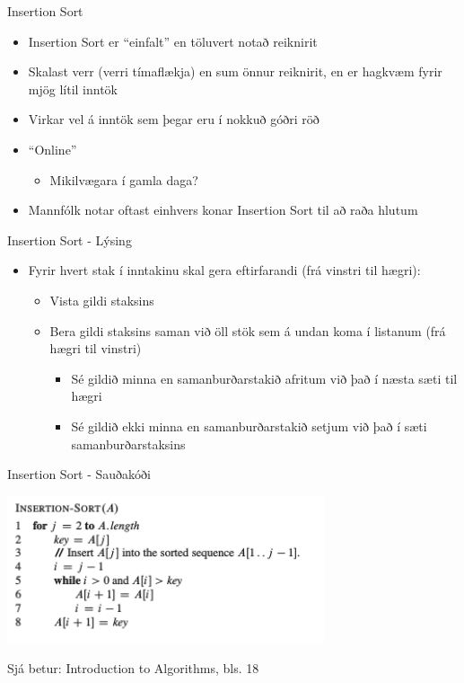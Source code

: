 \documentclass[handout]{beamer}
\begin{document}
\begin{frame}{Insertion Sort}
\begin{itemize}
 \item Insertion Sort er ``einfalt'' en töluvert notað reiknirit
 \item Skalast verr (verri tímaflækja) en sum önnur reiknirit, en er hagkvæm fyrir mjög lítil inntök
 \item Virkar vel á inntök sem þegar eru í nokkuð góðri röð
 \item ``Online''
 \begin{itemize}
  \item Mikilvægara í gamla daga?
 \end{itemize}
 \item Mannfólk notar oftast einhvers konar Insertion Sort til að raða hlutum
\end{itemize}
\end{frame}

\begin{frame}{Insertion Sort - Lýsing}
\begin{itemize}
 \item Fyrir hvert stak í inntakinu skal gera eftirfarandi (frá vinstri til hægri):
 \begin{itemize}
  \item Vista gildi staksins
  \item Bera gildi staksins saman við öll stök sem á undan koma í listanum (frá hægri til vinstri)
  \begin{itemize}
   \item Sé gildið minna en samanburðarstakið afritum við það í næsta sæti til hægri
   \item Sé gildið ekki minna en samanburðarstakið setjum við það í sæti samanburðarstaksins
  \end{itemize}
 \end{itemize}
\end{itemize}
\end{frame}

\begin{frame}[fragile]{Insertion Sort - Sauðakóði}
\begin{center}
\includegraphics[width=0.7\textwidth]{Pics/InsertionSort}
\end{center}
Sjá betur: Introduction to Algorithms, bls. 18
\end{frame}
\end{document}
